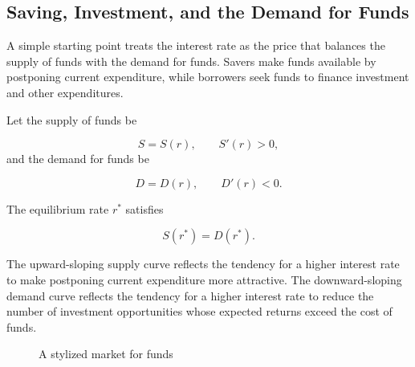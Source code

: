 \subsection{Saving, Investment, and the Demand for Funds}

A simple starting point treats the interest rate as the price that balances the supply of funds with the demand for funds. Savers make funds available by postponing current expenditure, while borrowers seek funds to finance investment and other expenditures.

Let the supply of funds be

\begin{equation}
S=S(r),
\qquad
S'(r)>0,
\label{eq:ch6-saving-supply}
\end{equation}
and the demand for funds be

\begin{equation}
D=D(r),
\qquad
D'(r)<0.
\label{eq:ch6-investment-demand}
\end{equation}

The equilibrium rate $r^{*}$ satisfies

\begin{equation}
S(r^{*})=D(r^{*}).
\label{eq:ch6-funds-equilibrium}
\end{equation}

The upward-sloping supply curve reflects the tendency for a higher interest rate to make postponing current expenditure more attractive. The downward-sloping demand curve reflects the tendency for a higher interest rate to reduce the number of investment opportunities whose expected returns exceed the cost of funds.


\begin{figure}[H]
\centering
{}
\caption{A stylized market for funds}
\label{fig:ch6-funds-market}
\end{figure}

